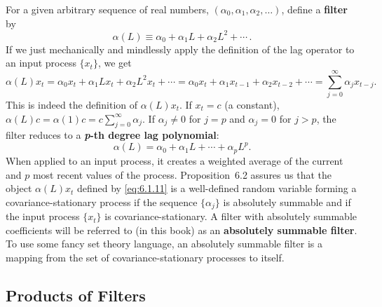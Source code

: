 For a given arbitrary sequence of real numbers, $(\alpha_0, \alpha_1, \alpha_2, \ldots)$, define a
\textbf{filter} by
\begin{equation}
  \alpha(L) \equiv \alpha_0 + \alpha_1 L + \alpha_2 L^2 + \cdots\,.
  \label{eq:6.1.10}
\end{equation}
If we just mechanically and mindlessly apply the definition of the lag operator to
an input process $\{x_t\}$, we get
\begin{equation}
  \alpha(L) x_t = \alpha_0 x_t + \alpha_1 L x_t + \alpha_2 L^2 x_t + \cdots
               = \alpha_0 x_t + \alpha_1 x_{t-1} + \alpha_2 x_{t-2} + \cdots
               = \sum_{j=0}^{\infty} \alpha_j x_{t-j}.
  \label{eq:6.1.11}
\end{equation}
This is indeed the definition of $\alpha(L) x_t$. If $x_t = c$ (a constant), $\alpha(L) c = \alpha(1) c =
c \sum_{j=0}^{\infty} \alpha_j$. If $\alpha_j \neq 0$ for $j = p$ and $\alpha_j = 0$ for $j > p$, the filter reduces to a \textbf{\textit{p}-th
degree lag polynomial}:
\[
  \alpha(L) = \alpha_0 + \alpha_1 L + \cdots + \alpha_p L^p.
\]
When applied to an input process, it creates a weighted average of the current
and $p$ most recent values of the process. Proposition~6.2 assures us that the object
$\alpha(L) x_t$ defined by \eqref{eq:6.1.11} is a well-defined random variable forming a covariance-stationary process if the sequence $\{\alpha_j\}$ is absolutely summable and if the input process
$\{x_t\}$ is covariance-stationary. A filter with absolutely summable coefficients
will be referred to (in this book) as an \textbf{absolutely summable filter}. To use some
fancy set theory language, an absolutely summable filter is a mapping from the set
of covariance-stationary processes to itself.

\subsection*{Products of Filters}

